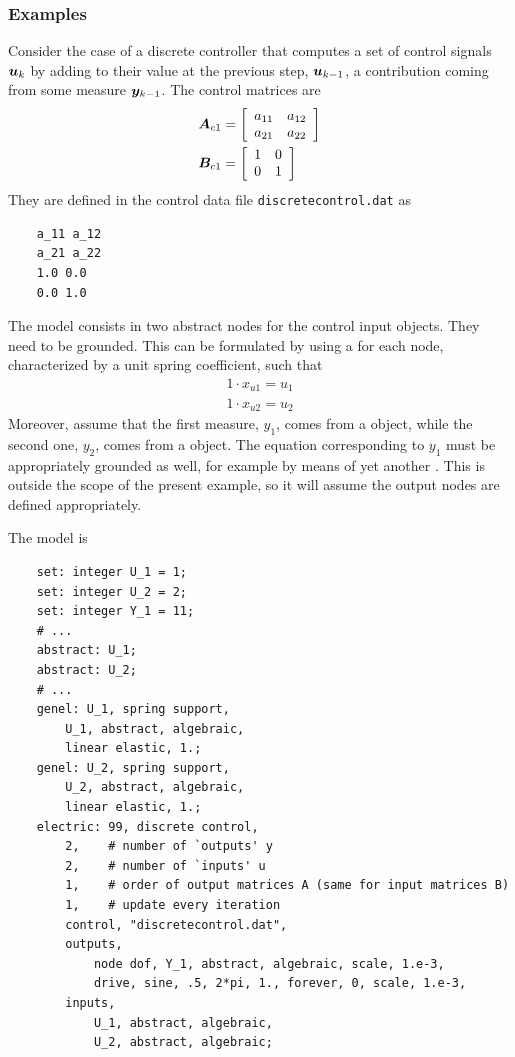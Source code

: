 \subsubsection{Examples}
Consider the case of a discrete controller that computes
a set of control signals $\T{u}_k$ by adding to their value
at the previous step, $\T{u}_{k-1}$, a contribution coming
from some measure $\T{y}_{k-1}$.
The control matrices are
\begin{subequations}
\begin{align}
	\TT{A}_{c1} &= \sqbr{\matr{cc}{
		a_{11} & a_{12} \\
		a_{21} & a_{22}
	}} \\
	\TT{B}_{c1} &= \sqbr{\matr{cc}{
		1 & 0 \\
		0 & 1
	}}
\end{align}
\end{subequations}
They are defined in the control data file \texttt{discretecontrol.dat} as
\begin{verbatim}
    a_11 a_12
    a_21 a_22
    1.0 0.0
    0.0 1.0
\end{verbatim}
The model consists in two abstract nodes for the control input
 objects.
They need to be grounded.
This can be formulated by using a  
for each  node, characterized by a unit spring coefficient,
such that
\begin{subequations}
\begin{align}
	1 \cdot x_{u1} = u_1 \\
	1 \cdot x_{u2} = u_2
\end{align}
\end{subequations}
Moreover, assume that the first measure, $y_1$,
comes from a  object,
while the second one, $y_2$, comes from a  object.
The equation corresponding to $y_1$ must be appropriately grounded
as well, for example by means of yet another 
.
This is outside the scope of the present example, so it will assume
the output nodes are defined appropriately.

The model is
\begin{verbatim}
    set: integer U_1 = 1;
    set: integer U_2 = 2;
    set: integer Y_1 = 11;
    # ...
    abstract: U_1;
    abstract: U_2;
    # ...
    genel: U_1, spring support,
        U_1, abstract, algebraic,
        linear elastic, 1.;
    genel: U_2, spring support,
        U_2, abstract, algebraic,
        linear elastic, 1.;
    electric: 99, discrete control,
        2,    # number of `outputs' y
        2,    # number of `inputs' u
        1,    # order of output matrices A (same for input matrices B)
        1,    # update every iteration
        control, "discretecontrol.dat",
        outputs,
            node dof, Y_1, abstract, algebraic, scale, 1.e-3,
            drive, sine, .5, 2*pi, 1., forever, 0, scale, 1.e-3,
        inputs,
            U_1, abstract, algebraic,
            U_2, abstract, algebraic;
\end{verbatim}




